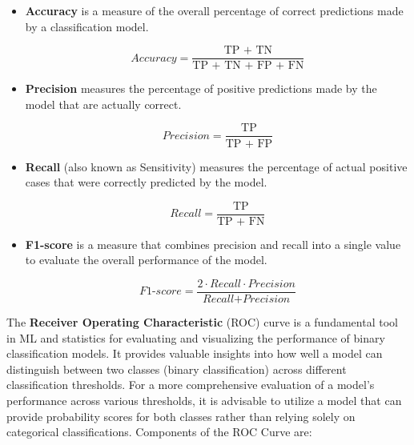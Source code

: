 \begin{itemize}
  \item{

  \textbf{Accuracy} is a measure of the overall percentage of correct predictions made by a classification model.

  \begin{equation}
    \textit{Accuracy} = \frac{\text{TP + TN}}{\text{TP + TN + FP + FN}}
    \label{formula:accuracy}
  \end{equation}

  }
  \item{

  \textbf{Precision} measures the percentage of positive predictions made by the model that are actually correct.

  \begin{equation}
    \textit{Precision} = \frac{\text{TP}}{\text{TP + FP}}
    \label{formula:precision}
  \end{equation}

  }
  \item{

  \textbf{Recall} (also known as Sensitivity)  measures the percentage of actual positive cases that were correctly predicted by the model.

  \begin{equation}
    \textit{Recall} = \frac{\text{TP}}{\text{TP + FN}}
    \label{formula:recall}
  \end{equation}

  }
  \item{

  \textbf{F1-score} is a measure that combines precision and recall into a single value to evaluate the overall performance of the model.


  \begin{equation}
    \textit{F1-score} = \frac{2 \cdot \textit{Recall} \cdot \textit{Precision}}{\textit{Recall} + \textit{Precision}}
    \label{formula:f1}
  \end{equation}
  
  }
\end{itemize} 


The \textbf{Receiver Operating Characteristic} (ROC) curve  is a fundamental tool in ML and statistics for evaluating and visualizing the performance of binary classification models. 
It provides valuable insights into how well a model can distinguish between two classes (binary classification) across different classification thresholds.
For a more comprehensive evaluation of a model's performance across various thresholds, 
it is advisable to utilize a model that can provide probability scores for both classes rather than relying solely on categorical classifications.
Components of the ROC Curve are:

